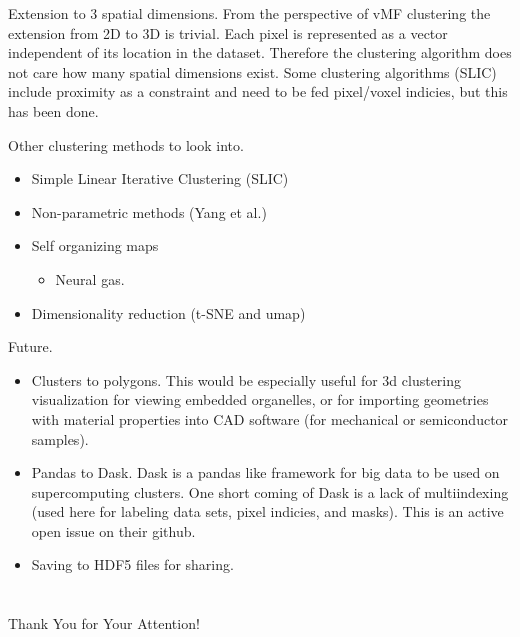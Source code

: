 \documentclass[
]{beamer}
\begin{document}
\begin{frame}{Extension to 3 spatial dimensions.}
From the perspective of vMF clustering the extension from 2D to 3D is trivial. Each pixel is represented as a vector independent of its location in the dataset. Therefore the clustering algorithm does not care how many spatial dimensions exist. Some clustering algorithms (SLIC) include proximity as a constraint and need to be fed pixel/voxel indicies, but this has been done.
\end{frame}

\begin{frame}{Other clustering methods to look into.}
\begin{itemize}
    \item Simple Linear Iterative Clustering (SLIC)
    \item Non-parametric methods (Yang et al.)
    \item Self organizing maps
    \begin{itemize}
        \item Neural gas.
    \end{itemize}
    \item Dimensionality reduction (t-SNE and umap)
\end{itemize}
\end{frame}

\begin{frame}{Future.}
\begin{itemize}
    \item Clusters to polygons. This would be especially useful for 3d clustering visualization for viewing embedded organelles, or for importing geometries with material properties into CAD software (for mechanical or semiconductor samples).
    \item Pandas to Dask. Dask is a pandas like framework for big data to be used on supercomputing clusters. One short coming of Dask is a lack of multiindexing (used here for labeling data sets, pixel indicies, and masks). This is an active open issue on their github.
    \item Saving to HDF5 files for sharing.
\end{itemize}
\end{frame}


\section{\bibname}
\begin{frame}[t, allowframebreaks]{\bibname}
\printbibliography[heading=none]
\end{frame}

\begin{frame}[plain]
\vfill
\centerline{Thank You for Your Attention!}
\vfill\vfill
\end{frame}
\end{document}
